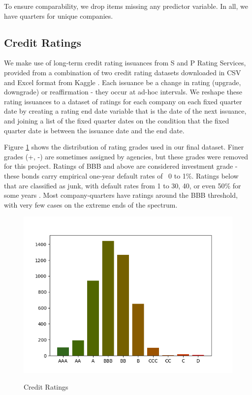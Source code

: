 \documentclass{article}[11pt]
\begin{document}
    To ensure comparability, we drop items missing any predictor variable. In all, we have \numQuarters \space quarters for \numCompanies \space unique companies.

    \subsection*{Credit Ratings}

    We make use of long-term credit rating issuances from S and P Rating Services, provided from a combination of two credit rating datasets downloaded in CSV and Excel format from Kaggle \citep{gewerc_corporate_2020,makwana_corporate_2022}. Each issuance be a change in rating (upgrade, downgrade) or reaffirmation - they occur at ad-hoc intervals. We reshape these rating issuances to a dataset of ratings for each company on each fixed quarter date by creating a rating end date variable that is the date of the next issuance, and joining a list of the fixed quarter dates on the condition that the fixed quarter date is between the issuance date and the end date.

    Figure \ref{fig:credit-ratings} shows the distribution of rating grades used in our final dataset. Finer grades (+, -) are sometimes assigned by agencies, but these grades were removed for this project. Ratings of BBB and above are considered investment grade - these bonds carry empirical one-year default rates of ~0 to 1\%. Ratings below that are classified as junk, with default rates from 1 to 30, 40, or even 50\% for some years \citep{s_and_p_global_ratings_s_2024}. Most company-quarters have ratings around the BBB threshold, with very few cases on the extreme ends of the spectrum.

    \begin{figure}[h!]
		\centering
        \caption{Credit Ratings}
        \includegraphics[width=0.6\linewidth,keepaspectratio=true]{../Output/All Data EDA/Tabular EDA/Distribution of Rating Issuances_no_title.png}
        \label{fig:credit-ratings}
	\end{figure}
\end{document}
